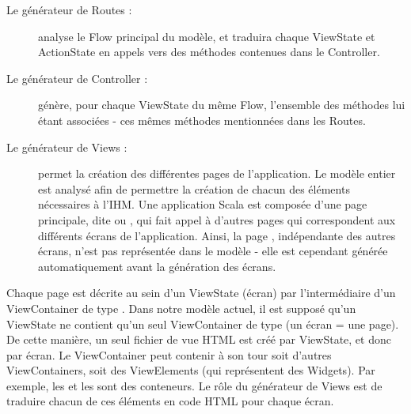 \begin{description}

\item[Le générateur de Routes :] analyse le Flow principal du modèle, et traduira chaque ViewState et ActionState en appels vers des méthodes contenues dans le Controller.

\item[Le générateur de Controller :] génère, pour chaque ViewState du même Flow, l'ensemble des méthodes lui étant associées - ces mêmes méthodes mentionnées dans les Routes.

\item[Le générateur de Views :] permet la création des différentes pages de l'application. Le modèle entier est analysé afin de permettre la création de chacun des éléments nécessaires à l'\textsc{IHM}. Une application Scala est composée d'une page principale, dite  ou , qui fait appel à d'autres pages qui correspondent aux différents écrans de l'application. Ainsi, la page , indépendante des autres écrans, n'est pas représentée dans le modèle - elle est cependant générée automatiquement avant la génération des écrans.

\end{description}
Chaque page est décrite au sein d'un ViewState (écran) par l'intermédiaire d'un ViewContainer de type . Dans notre modèle actuel, il est supposé qu'un ViewState ne contient qu'un seul ViewContainer de type  (un écran = une page). De cette manière, un seul fichier de vue HTML est créé par ViewState, et donc par écran. Le ViewContainer  peut contenir à son tour soit d'autres ViewContainers, soit des ViewElements (qui représentent des Widgets). Par exemple, les  et les  sont des conteneurs. Le rôle du générateur de Views est de traduire chacun de ces éléments en code HTML pour chaque écran.


